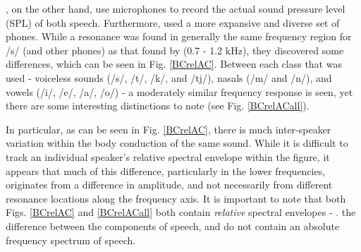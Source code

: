 \cite{reinfeldt:10}, on the other hand, use microphones to record the actual sound pressure level (SPL) of both \DIFdelbegin {}\DIFdelend \DIFaddbegin {}\DIFaddend speech. Furthermore, \cite{reinfeldt:10} used a more expansive and diverse set of phones.  While a resonance was found in generally the same frequency region for /s/ (and other phones) as that found by \cite{porschmann:00} (0.7 - 1.2 kHz), they discovered some \DIFdelbegin {}\DIFdelend \DIFaddbegin {}\DIFaddend differences, which can be seen in Fig. \ref{BCrelAC}. Between each class that was used - voiceless sounds (/s/, /t/, /k/, and /tj/),  nasals (/m/ and /n/), and vowels (/i/, /e/, /a/, /o/) - a moderately similar frequency response is seen, yet there are some interesting distinctions to note (see Fig. \ref{BCrelACall}).

In particular, as can be seen in Fig. \ref{BCrelAC}, there is much inter-speaker variation within the body conduction of the same sound.  While it is difficult to track an individual speaker's relative spectral envelope within the figure, it appears that much of this difference, particularly in the lower frequencies, originates from a difference in amplitude, and not necessarily from different resonance locations along the frequency axis.  It is important to note that both Figs. \ref{BCrelAC} and \ref{BCrelACall} both contain \textit{relative} spectral envelopes - \DIFdelbegin {}\DIFdelend \DIFaddbegin {}\DIFaddend . the difference between the \DIFdelbegin {}\DIFdelend \DIFaddbegin {}\DIFaddend components of speech, and do not contain an absolute frequency spectrum of \DIFdelbegin {}\DIFdelend \DIFaddbegin {}\DIFaddend speech. 

